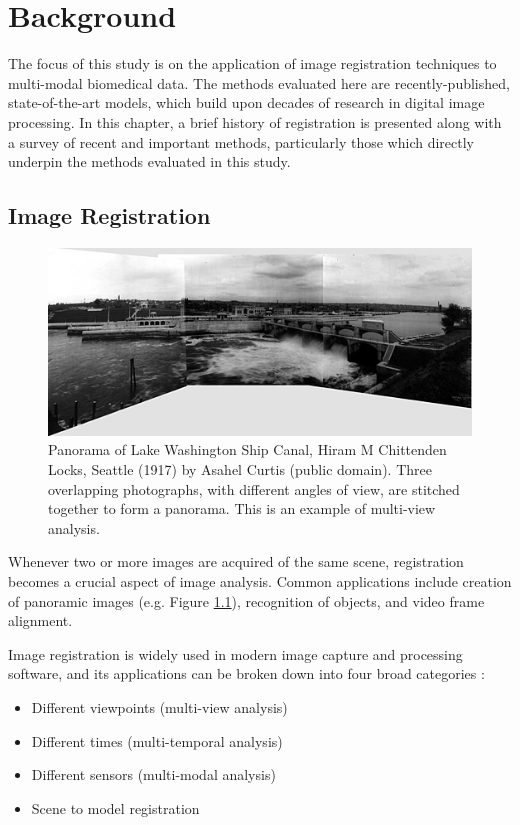 \documentclass{report}
\begin{document}


\chapter{Background}
The focus of this study is on the application of image registration techniques to multi-modal biomedical data. The methods evaluated here are recently-published, state-of-the-art models, which build upon decades of research in digital image processing.
In this chapter, a brief history of registration is presented along with a survey of recent and important methods, particularly those which directly underpin the methods evaluated in this study.

\section{Image Registration}

\begin{figure}
\centering
\includegraphics[width = 5 in]{Asahel_Curtis_panorama.jpeg}
\caption{Panorama of Lake Washington Ship Canal, Hiram M Chittenden Locks, Seattle (1917) by Asahel Curtis (public domain). Three overlapping photographs, with different angles of view, are stitched together to form a panorama. This is an example of multi-view analysis.}
\label{fig:image_stitching}
\end{figure}

Whenever two or more images are acquired of the same scene, registration becomes a crucial aspect of image analysis. Common applications include creation of panoramic images (e.g. Figure \ref{fig:image_stitching}), recognition of objects, and video frame alignment. 

Image registration is widely used in modern image capture and processing software, and its applications can be broken down into four broad categories \citep{zitova2003image}:
\begin{itemize}
\item Different viewpoints (multi-view analysis)
\item Different times (multi-temporal analysis)
\item Different sensors (multi-modal analysis)
\item Scene to model registration
\end{itemize}
\end{document}
